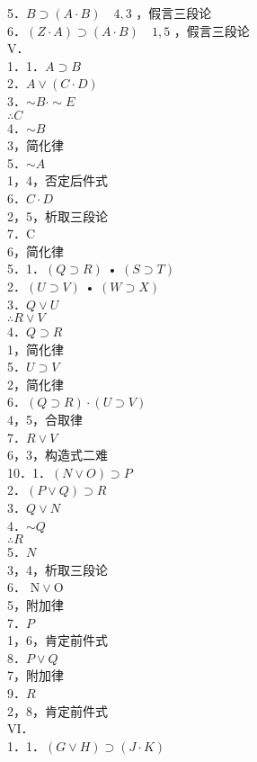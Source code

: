 5．$B \supset(A \cdot B) \quad 4,3$ ，假言三段论\\
6．$(Z \cdot A) \supset(A \cdot B) \quad 1,5$ ，假言三段论\\
V．\\
1．1．$A \supset B$\\
2．$A \vee(C \cdot D)$\\
3．$\sim B \cdot \sim E$\\
$\therefore C$\\
4．$\sim B$\\
3，简化律\\
5．$\sim A$\\
1，4，否定后件式\\
6．$C \cdot D$\\
2，5，析取三段论\\
7．C\\
6，简化律\\
5．1．$(Q \supset R)$ • $(S \supset T)$\\
2．$(U \supset V)$ • $(W \supset X)$\\
3．$Q \vee U$\\
$\therefore R \vee V$\\
4．$Q \supset R$\\
1，简化律\\
5．$U \supset V$\\
2，简化律\\
6．$(Q \supset R) \cdot(U \supset V)$\\
4，5，合取律\\
7．$R \vee V$\\
6，3，构造式二难\\
10．1．$(N \vee O) \supset P$\\
2．$(P \vee Q) \supset R$\\
3．$Q \vee N$\\
4．$\sim Q$\\
$\therefore R$\\
5．$N$\\
3，4，析取三段论\\
6． $\mathrm{N} \vee \mathrm{O}$\\
5，附加律\\
7．$P$\\
1，6，肯定前件式\\
8．$P \vee Q$\\
7，附加律\\
9．$R$\\
2，8，肯定前件式\\
VI．\\
1．1．$(G \vee H) \supset(J \cdot K)$\\
